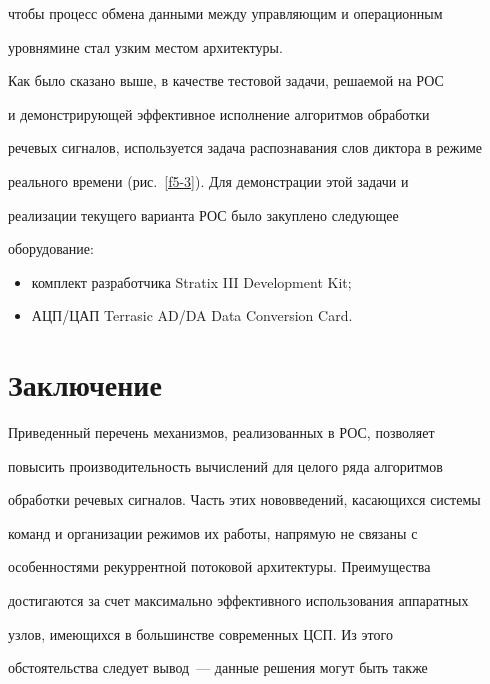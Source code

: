 чтобы процесс обмена данными между управляющим и операционным 


уровнями\linebreak не стал узким местом архитектуры.


      


      Как было сказано выше, в качестве тестовой задачи, ре\-ша\-емой на РОС 


и демонстрирующей эффективное исполнение алгоритмов обработки 


речевых сигналов, используется задача распознавания слов диктора в режиме 


реального времени (рис.~\ref{f5-3}). Для демонстрации этой задачи и 


реализации текущего варианта РОС было закуплено следующее 


оборудование:


      \begin{itemize}


\item комплект разработчика Stratix III Development Kit;


\item АЦП/ЦАП Terrasic AD/DA Data Conversion Card.


\end{itemize}





\section{Заключение}


      


      Приведенный перечень механизмов, реализованных в РОС, позволяет 


повысить производительность вычислений для целого ряда алгоритмов 


обработки речевых сигналов. Часть этих нововведений, касающихся системы 


команд и организации режимов их работы, напрямую не связаны с 


особенностями рекуррентной потоковой архитектуры. Преимущества 


достигаются за счет максимально эффективного использования аппаратных 


узлов, имеющихся в большинстве современных ЦСП. Из этого 


обстоятельства следует вывод~--- данные решения могут быть также 


